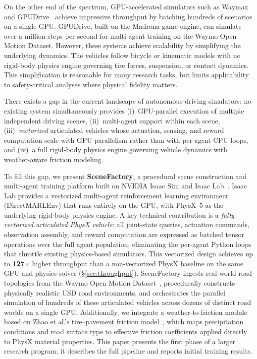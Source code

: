 On the other end of the spectrum, GPU-accelerated simulators such as Waymax~\cite{gulino_waymax_2023} and GPUDrive~\cite{kazemkhani_gpudrive_2025} achieve impressive throughput by batching hundreds of scenarios on a single GPU.
GPUDrive, built on the Madrona game engine, can simulate over a million steps per second for multi-agent training on the Waymo Open Motion Dataset.
However, these systems achieve scalability by simplifying the underlying dynamics. The vehicles follow bicycle or kinematic models with no rigid-body physics engine governing tire forces, suspension, or contact dynamics.
This simplification is reasonable for many research tasks, but limits applicability to safety-critical analyses where physical fidelity matters.


There exists a gap in the current landscape of autonomous-driving simulators: no existing system simultaneously provides
(i)~GPU-parallel execution of multiple independent driving scenes,
(ii)~multi-agent support within each scene,
(iii)~\emph{vectorized} articulated vehicles whose actuation, sensing, and reward computation scale with GPU parallelism rather than with per-agent CPU loops, and
(iv)~a full rigid-body physics engine governing vehicle dynamics with weather-aware friction modeling.


To fill this gap, we present \textbf{SceneFactory}, a procedural scene construction and multi-agent training platform built on NVIDIA Isaac Sim and Isaac Lab~\cite{nvidia_isaac_2025}.
Isaac Lab provides a vectorized multi-agent reinforcement learning environment (DirectMARLEnv) that runs entirely on the GPU, with PhysX~5 as the underlying rigid-body physics engine.
A key technical contribution is a \emph{fully vectorized articulated PhysX vehicle}: all joint-state queries, actuation commands, observation assembly, and reward computation are expressed as batched tensor operations over the full agent population, eliminating the per-agent Python loops that throttle existing physics-based simulators.
This vectorized design achieves up to \textbf{127$\times$} higher throughput than a non-vectorized PhysX baseline on the same GPU and physics solver (\S\ref{sec:throughput}).
SceneFactory ingests real-world road topologies from the Waymo Open Motion Dataset~\cite{Kan_2024_icra}, procedurally constructs physically realistic USD road environments, and orchestrates the parallel simulation of hundreds of these articulated vehicles across dozens of distinct road worlds on a single GPU.
Additionally, we integrate a weather-to-friction module based on Zhao et al.'s tire--pavement friction model~\cite{zhao_tire-pavement_2024}, which maps precipitation conditions and road surface type to effective friction coefficients applied directly to PhysX material properties.
This paper presents the first phase of a larger research program; it describes the full pipeline and reports initial training results.

